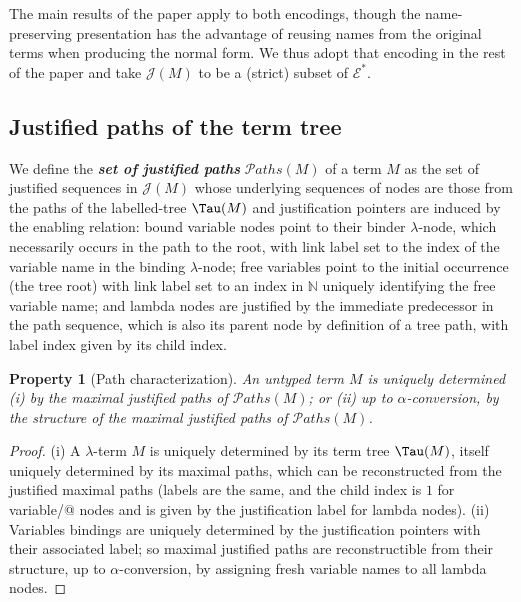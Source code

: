 \documentclass[xchauthor,chkrefs,GCNS,amsmath,amsthm,rotating,leaveRGB]{tcsg}
\renewcommand{\index}[1]{}
\theoremstyle{plain}
\newtheorem{property}[theorem]{Property}
\theoremstyle{definition}
\def\nameencoding{\mathcal{E}}
\newcommand{\ctree}{\Tau}
\newcommand{\pathset}{{\mathcal{P}aths}}
\def\justseqset{\mathcal{J}}
\begin{document}
The main results of the paper apply to both encodings, though the
name-preserving presentation has the advantage of reusing names from the
original terms when producing the normal form. We thus adopt that encoding in
the rest of the paper and take $\justseqset (M)$ to be a (strict) subset of
$\nameencoding ^{*}$.

\subsection{Justified paths of the term tree}\label{sec2.7}

We define the \textbf{\emph{set of justified paths}}\index{set of justified
paths} $\pathset (M)$ of a term $M$ as the set of justified sequences in
$\justseqset (M)$ whose underlying sequences of nodes are those from the
paths of the labelled-tree $\ctree (M)$ and justification pointers are
induced by the enabling relation: bound variable nodes point to their binder
$\lambda $-node, which necessarily occurs in the path to the root, with link
label set to the index of the variable name in the binding $\lambda $-node;
free variables point to the initial occurrence (the tree root) with link
label  set to an index in $\mathbb {N}$ uniquely identifying the free
variable name; and lambda nodes are justified by the immediate predecessor in
the path sequence, which is also its parent node by definition of a tree
path, with label index given by its child index.

\begin{property}[Path characterization]\label{prop:tree_path_charact}
An untyped term $M$ is uniquely determined (i) by the maximal justified paths
of $\pathset (M)$; or (ii) up to $\alpha $-conversion, by the
\emph{structure} of the maximal justified paths of $\pathset (M)$.
\end{property}

\begin{proof}
(i) A $\lambda $-term $M$ is uniquely determined by its term tree $\ctree
(M)$, itself uniquely determined by its maximal paths, which can be
reconstructed from the justified maximal paths (labels are the same, and the
child index is $1$ for variable/@ nodes and is given by the justification
label for lambda nodes). (ii) Variables bindings are uniquely determined by
the justification pointers with their associated label; so maximal justified
paths are  reconstructible from their structure, up to $\alpha $-conversion,
by assigning fresh variable names to all lambda nodes.
\end{proof}
\end{document}

